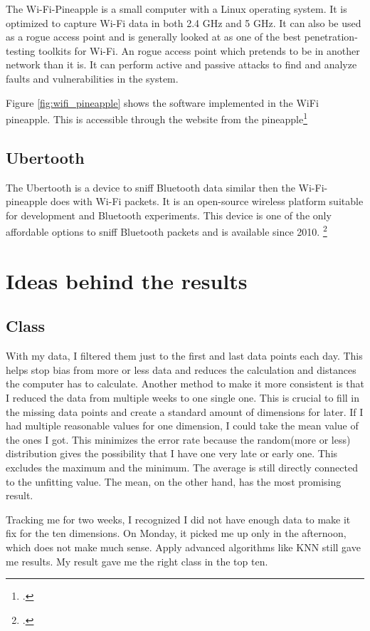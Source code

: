 \documentclass[11pt]{article}
\begin{document}
The Wi-Fi-Pineapple is a small computer with a Linux operating system. It is optimized to capture Wi-Fi data in both 2.4 GHz and 5 GHz. It can also be used as a rogue access point and is generally looked at as one of the best penetration-testing toolkits for Wi-Fi. An rogue access point which pretends to be in another network than it is. It can perform active and passive attacks to find and analyze faults and vulnerabilities in the system.

Figure \ref{fig:wifi_pineapple} shows the software implemented in the WiFi pineapple. This is accessible through the website from the pineapple\footcite{wifipineapple}
\subsection{Ubertooth}
The Ubertooth is a device to sniff Bluetooth data similar then the Wi-Fi-pineapple does with Wi-Fi packets. It is an open-source wireless platform suitable for development and Bluetooth experiments. This device is one of the only affordable options to sniff Bluetooth packets and is available since 2010.
\footcite{ubertooth}
\section{Ideas behind the results}
\subsection{Class}

With my data, I filtered them just to the first and last data points each day. This helps stop bias from more or less data and reduces the calculation and distances the computer has to calculate. Another method to make it more consistent is that I reduced the data from multiple weeks to one single one. This is crucial to fill in the missing data points and create a standard amount of dimensions for later. If I had multiple reasonable values for one dimension, I could take the mean value of the ones I got. This minimizes the error rate because the random(more or less) distribution gives the possibility that I have one very late or early one. This excludes the maximum and the minimum. The average is still directly connected to the unfitting value. The mean, on the other hand, has the most promising result.

Tracking me for two weeks, I recognized I did not have enough data to make it fix for the ten dimensions. On Monday, it picked me up only in the afternoon, which does not make much sense. Apply advanced algorithms like KNN still gave me results. My result gave me the right class in the top ten.
\end{document}
